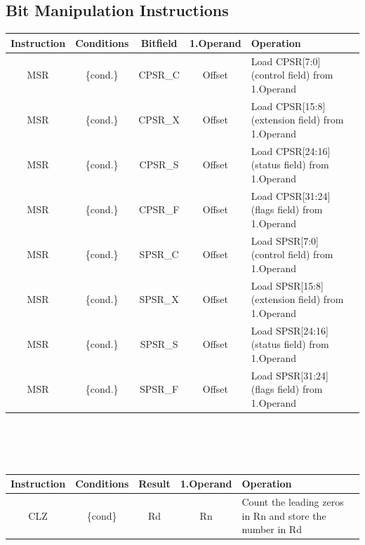 {\begin{landscape}
\newpage
\section{Bit Manipulation Instructions}
\begin{tabular}{|c|c|c|c|l|}
\hline
Instruction & Conditions & Bitfield & 1.Operand & Operation\\
\hline
MSR & \{cond.\} & CPSR\_C & Offset & Load CPSR[7:0] (control field) from 1.Operand\\ 
\hline
MSR & \{cond.\} & CPSR\_X & Offset & Load CPSR[15:8] (extension field) from 1.Operand\\ 
\hline
MSR & \{cond.\} & CPSR\_S & Offset & Load CPSR[24:16] (status field) from 1.Operand\\ 
\hline
MSR & \{cond.\} & CPSR\_F & Offset & Load CPSR[31:24] (flags field) from 1.Operand\\ 
\hline
\hline
MSR & \{cond.\} & SPSR\_C & Offset & Load SPSR[7:0] (control field) from 1.Operand\\ 
\hline
MSR & \{cond.\} & SPSR\_X & Offset & Load SPSR[15:8] (extension field) from 1.Operand\\ 
\hline
MSR & \{cond.\} & SPSR\_S & Offset & Load SPSR[24:16] (status field) from 1.Operand\\ 
\hline
MSR & \{cond.\} & SPSR\_F & Offset & Load SPSR[31:24] (flags field) from 1.Operand\\ 
\hline
\end{tabular}\\
\\
\\
\begin{tabular}{|c|c|c|c|l|}
\hline
Instruction & Conditions & Result & 1.Operand & Operation\\
\hline
CLZ & \{cond\} & Rd & Rn & Count the leading zeros in Rn and store the number in Rd\\
\hline
\end{tabular}\\

\newpage

\end{landscape}}

